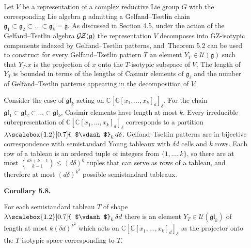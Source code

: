 \documentclass[10pt,a4paper]{article}
\begin{document}
Let $V$ be a representation of a complex reductive Lie group $G$ with the corresponding Lie algebra $\mathfrak{g}$ admitting a Gelfand–Tsetlin chain $\mathfrak{g}_{1}\subset\mathfrak{g}_{2}\subset\dots\subset\mathfrak{g}_{k}=\mathfrak{g}$.
As discussed in Section 4.5, under the action of the Gelfand–Tsetlin algebra $\mathcal{G}\hskip-1.00006pt\mathcal{Z}(\mathfrak{g})$ the representation $V$ decomposes into GZ-isotypic components indexed by Gelfand–Tsetlin patterns, and Theorem 5.2 can be used to construct for every Gelfand–Tsetlin pattern $T$ an element $Y_{T}\in\mathcal{U}(\mathfrak{g})$ such that $Y_{T}.x$ is the projection of $x$ onto the $T$-isotypic subspace of $V$.
The length of $Y_{T}$ is bounded in terms of the lengths of Casimir elements of $\mathfrak{g}_{\ell}$ and the number of Gelfand–Tsetlin patterns appearing in the decomposition of $V$.





Consider the case of $\mathfrak{gl}_{k}$ acting on $\mathbb{C}[\mathbb{C}[x_{1},\dots,x_{k}]_{d}]_{\delta}$.
For the chain $\mathfrak{gl}_{1}\subset\mathfrak{gl}_{2}\subset\dots\subset\mathfrak{gl}_{k}$, Casimir elements have length at most $k$.
Every irreducible subrepresentation of $\mathbb{C}[\mathbb{C}[x_{1},\dots,x_{k}]_{d}]_{\delta}$ corresponds to a partition $\lambda\mathchoice{\scalebox{1.2}[0.7]{ $\vdash$}_{k}\,}{\scalebox{1.2}[0.7]{ $\vdash$}_{k}\,}{\scalebox{0.7}{\scalebox{1.2}[0.7]{$\vdash$}}_{k}\,}{\scalebox{0.5}{\scalebox{1.2}[0.7]{$\vdash$}}_{k}\,}{d\delta}$.
Gelfand–Tsetlin patterns are in bijective correspondence with semistandard Young tableaux with $\delta d$ cells and $k$ rows.
Each row of a tableau is an ordered tuple of integers from $\{1,\dots,k\}$, so there are at most $\binom{d\delta+k-1}{k-1}\leq(d\delta)^{k}$ tuples that can serve as rows of a tableau, and therefore at most $(d\delta)^{k^{2}}$ possible semistandard tableaux.





\par\medskip\noindent\textbf{Corollary 5.8.}\par



For each semistandard tableau $T$ of shape $\lambda\mathchoice{\scalebox{1.2}[0.7]{ $\vdash$}_{k}\,}{\scalebox{1.2}[0.7]{ $\vdash$}_{k}\,}{\scalebox{0.7}{\scalebox{1.2}[0.7]{$\vdash$}}_{k}\,}{\scalebox{0.5}{\scalebox{1.2}[0.7]{$\vdash$}}_{k}\,}{\delta d}$ there is an element $Y_{T}\in\mathcal{U}(\mathfrak{gl}_{k})$ of length at most $k(\delta d)^{k^{2}}$ which acts on $\mathbb{C}[\mathbb{C}[x_{1},\ldots,x_{k}]_{d}]_{\delta}$ as the projector onto the $T$-isotypic space corresponding to $T$.
\end{document}
